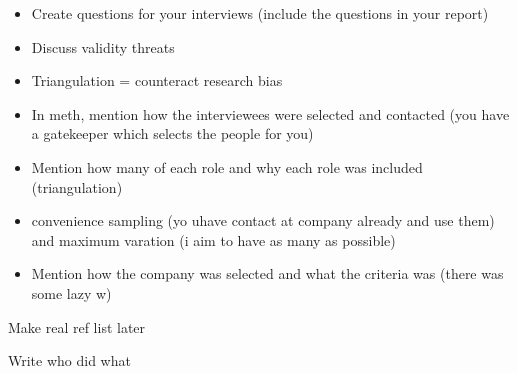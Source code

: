 \documentclass[times, 10pt,twocolumn]{Article}
\begin{document}







\begin{itemize}
\item Create questions for your interviews (include the questions in your report)
\item Discuss validity threats
\item Triangulation = counteract research bias
\item In meth, mention how the interviewees were selected and contacted (you have a gatekeeper which selects the people for you)
\item Mention how many of each role and why each role was included (triangulation)
\item convenience sampling (yo uhave contact at company already and use them) and maximum varation (i aim to have as many as possible)
\item Mention how the company was selected and what the criteria was (there was some lazy w)
\end{itemize}

Make real ref list later


Write who did what
\end{document}
